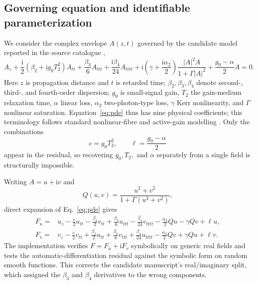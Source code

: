 \documentclass[11pt]{article}
\newcommand{\ii}{\mathrm{i}}
\begin{document}
\subsection{Governing equation and identifiable parameterization}

We consider the complex envelope $A(z,t)$ governed by the candidate model
reported in the source catalogue \citep{catalogue2026},
\begin{equation}
\label{eq:pde}
A_z+\frac{\ii}{2}\left(\beta_2+\ii g_0T_2^2\right)A_{tt}
+\frac{\beta_3}{6}A_{ttt}
+\frac{\ii\beta_4}{24}A_{tttt}
+\ii\left(\gamma+\frac{\ii\alpha_2}{2}\right)
\frac{|A|^2A}{1+\Gamma|A|^2}
+\frac{g_0-\alpha}{2}A=0 .
\end{equation}
Here $z$ is propagation distance and $t$ is retarded time;
$\beta_2,\beta_3,\beta_4$ denote second-, third-, and fourth-order dispersion;
$g_0$ is small-signal gain, $T_2$ the gain-medium relaxation time, $\alpha$
linear loss, $\alpha_2$ two-photon-type loss, $\gamma$ Kerr nonlinearity, and
$\Gamma$ nonlinear saturation.  Equation~\eqref{eq:pde} thus has nine physical
coefficients; this terminology follows standard nonlinear-fibre and active-gain
modelling \citep{agrawal2019,ndichia2026}.  Only the combinations
\begin{equation}
\label{eq:reduced-coeffs}
c=g_0T_2^2, \qquad \ell=\frac{g_0-\alpha}{2}
\end{equation}
appear in the residual, so recovering $g_0,T_2,$ and $\alpha$ separately from
a single field is structurally impossible.

Writing $A=u+\ii v$ and
\begin{equation}
Q(u,v)=\frac{u^2+v^2}{1+\Gamma(u^2+v^2)},
\end{equation}
direct expansion of Eq.~\eqref{eq:pde} gives
\begin{align}
F_u={}&u_z-\frac{c}{2}u_{tt}-\frac{\beta_2}{2}v_{tt}
+\frac{\beta_3}{6}u_{ttt}-\frac{\beta_4}{24}v_{tttt}
-\frac{\alpha_2}{2}Qu-\gamma Qv+\ell u,
\label{eq:Fu}\\
F_v={}&v_z-\frac{c}{2}v_{tt}+\frac{\beta_2}{2}u_{tt}
+\frac{\beta_3}{6}v_{ttt}+\frac{\beta_4}{24}u_{tttt}
-\frac{\alpha_2}{2}Qv+\gamma Qu+\ell v.
\label{eq:Fv}
\end{align}
The implementation verifies $F=F_u+\ii F_v$ symbolically on generic real
fields and tests the automatic-differentiation residual against the symbolic
form on random smooth functions.  This corrects the candidate manuscript's
real/imaginary split, which assigned the $\beta_3$ and $\beta_4$ derivatives
to the wrong components.
\end{document}
